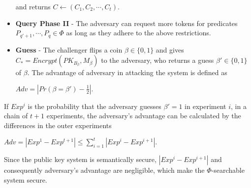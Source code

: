 \begin{itemize}
and returns $C \leftarrow (C_1, C_2, \cdots, C_t)$.

\item \textbf{Query Phase II} - The adversary can request more tokens for predicates $P_{q'+1}, \cdots,P_q \in \Phi$ as long as they
adhere to the above restrictions.

\item \textbf{Guess} - The challenger flips a coin $\beta \in \{0,1\}$ and gives $C_* = Encrypt(PK_{B_{\beta}},M_{\beta})$ to the adversary, who returns a guess $\beta' \in \{0,1\}$ of $\beta$. The advantage of adversary in attacking the system is defined as

$
Adv = |Pr(\beta = \beta')-\frac{1}{2}|.
$

\end{itemize}

If $Exp^i$ is the probability that the adversary guesses $\beta' = 1$ in experiment $i$, in a chain of $t+1$ experiments, the adversary's advantage can be calculated by the differences in the outer experiments

$
Adv = |Exp^1 - Exp^{t+1}| \leq \sum \limits_{i=1}^t|Exp^i - Exp^{i+1}| .
$

Since the public key system is semantically secure, $|Exp^i - Exp^{i+1}|$ and consequently adversary's advantage are negligible, which make the $\Phi$-searchable system secure.